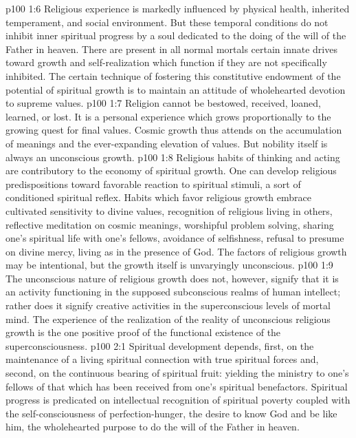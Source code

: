 \vs p100 1:6 \pc Religious experience is markedly influenced by physical health, inherited temperament, and social environment. But these temporal conditions do not inhibit inner spiritual progress by a soul dedicated to the doing of the will of the Father in heaven. There are present in all normal mortals certain innate drives toward growth and self\hyp{}realization which function if they are not specifically inhibited. The certain technique of fostering this constitutive endowment of the potential of spiritual growth is to maintain an attitude of wholehearted devotion to supreme values.
\vs p100 1:7 Religion cannot be bestowed, received, loaned, learned, or lost. It is a personal experience which grows proportionally to the growing quest for final values. Cosmic growth thus attends on the accumulation of meanings and the ever\hyp{}expanding elevation of values. But nobility itself is always an unconscious growth.
\vs p100 1:8 Religious habits of thinking and acting are contributory to the economy of spiritual growth. One can develop religious predispositions toward favorable reaction to spiritual stimuli, a sort of conditioned spiritual reflex. Habits which favor religious growth embrace cultivated sensitivity to divine values, recognition of religious living in others, reflective meditation on cosmic meanings, worshipful problem solving, sharing one’s spiritual life with one’s fellows, avoidance of selfishness, refusal to presume on divine mercy, living as in the presence of God. The factors of religious growth may be intentional, but the growth itself is unvaryingly unconscious.
\vs p100 1:9 The unconscious nature of religious growth does not, however, signify that it is an activity functioning in the supposed subconscious realms of human intellect; rather does it signify creative activities in the superconscious levels of mortal mind. The experience of the realization of the reality of unconscious religious growth is the one positive proof of the functional existence of the superconsciousness.
\vs p100 2:1 Spiritual development depends, first, on the maintenance of a living spiritual connection with true spiritual forces and, second, on the continuous bearing of spiritual fruit: yielding the ministry to one’s fellows of that which has been received from one’s spiritual benefactors. Spiritual progress is predicated on intellectual recognition of spiritual poverty coupled with the self\hyp{}consciousness of perfection\hyp{}hunger, the desire to know God and be like him, the wholehearted purpose to do the will of the Father in heaven.
